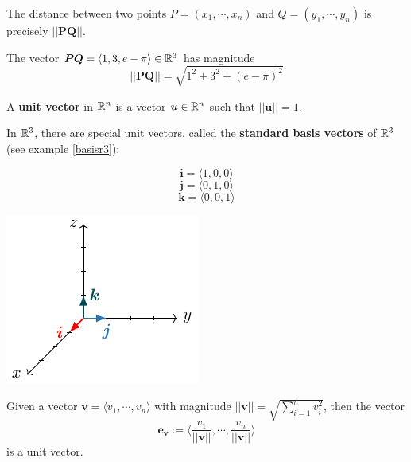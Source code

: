     \begin{proposition}
        The distance between two points $P = (x_1, \cdots, x_n)$ and $Q = (y_1, \cdots, y_n)$ is precisely $||\bm{PQ}||$.
    \end{proposition}
    
    \begin{example}
    The vector $\bm{PQ} = \langle 1, 3, e-\pi \rangle \in \mathbb{R}^3$ has magnitude $$||\bm{PQ}|| = \sqrt{1^2+3^2 + (e-\pi)^2}$$
    \end{example}
    

    \begin{definition}
    A \textbf{unit vector} in $\mathbb{R}^n$ is a vector $\bm{u} \in \mathbb{R}^n$ such that $||\bm{u}|| = 1$.
    \end{definition}

    \begin{example}
        In $\mathbb{R}^3$, there are special unit vectors, called the \textbf{standard basis vectors} of $\mathbb{R}^3$ (see example \ref{basisr3}):
        
        $$\bm{i} = \langle 1, 0, 0 \rangle$$
        $$\bm{j} = \langle 0, 1, 0 \rangle$$
        $$\bm{k} = \langle 0, 0, 1 \rangle$$
        

 \begin{center}        
        \includegraphics{chapters/1-LinearAlgebra/figures/figures-standardbasis.pdf}
    \end{center}
        
    \end{example}


    \begin{proposition}
        Given a vector $\bm{v} = \langle v_1, \cdots, v_n\rangle$ with magnitude $||\bm{v}|| = \sqrt{\sum_{i=1}^n v_i^2}$, then the vector $$\bm{e_v} := \langle \frac{v_1}{||\bm{v}||}, \cdots, \frac{v_n}{||\bm{v}||} \rangle$$ is a unit vector.
    \end{proposition}


